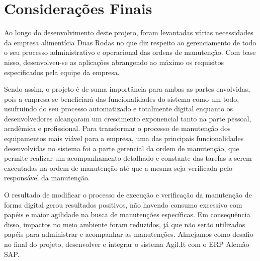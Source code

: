 \chapter{Considerações Finais}






Ao longo do desenvolvimento deste projeto, foram levantadas várias necessidades da empresa alimentícia Duas Rodas no que diz respeito ao gerenciamento de todo o seu processo administrativo e operacional das ordens de manutenção. Com base nisso, desenvolveu-se as aplicações abrangendo ao máximo os requisitos especificados pela equipe da empresa.

Sendo assim, o projeto é de suma importância para ambas as partes envolvidas, pois a empresa se beneficiará das funcionalidades do sistema como um todo, usufruindo do seu processo automatizado e totalmente digital enquanto os desenvolvedores alcançaram um crescimento exponencial tanto na parte pessoal, acadêmica e profissional. 
Para transformar o processo de manutenção dos equipamentos mais viável para a empresa, uma das principais funcionalidades desenvolvidas no sistema foi a parte gerencial da ordem de manutenção, que permite realizar um acompanhamento detalhado e constante das tarefas a serem executadas na ordem de manutenção até que a mesma seja verificada pelo responsável da manutenção. 

O resultado de modificar o processo de execução e verificação da manutenção de forma digital gerou resultados positivos, não havendo consumo excessivo com papéis e maior agilidade na busca de manutenções específicas. Em consequência disso, impactos no meio ambiente foram reduzidos, já que não serão utilizados papéis para administrar e acompanhar as manutenções. Almejamos como desafio no final do projeto, desenvolver e integrar o sistema Agil.It com o ERP Alemão SAP.